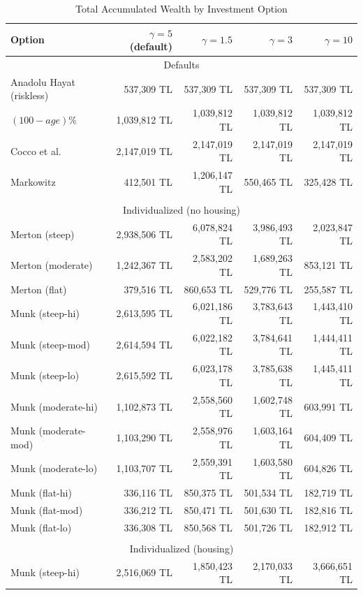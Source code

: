 \begin{table}%
	\centering
	\caption{Total Accumulated Wealth by Investment Option}
	\begin{tabular}[c]{lrrrr}
		\hline
		Option&$\gamma=5$ (default) & $\gamma=1.5$ & $\gamma=3$ & $\gamma=10$\\
		\hline
		\multicolumn{5}{c}{Defaults}\\
		Anadolu Hayat (riskless)&537,309 TL&537,309 TL&537,309 TL&537,309 TL\\
		$(100-age)\%$&1,039,812 TL&1,039,812 TL&1,039,812 TL&1,039,812 TL\\
		Cocco et al.&2,147,019 TL&2,147,019 TL&2,147,019 TL&2,147,019 TL\\
		Markowitz&412,501 TL&1,206,147 TL&550,465 TL&325,428 TL\\
		\multicolumn{5}{c}{}\\
		\multicolumn{5}{c}{Individualized (no housing)}\\
		Merton (steep) & 2,938,506 TL&6,078,824 TL&3,986,493 TL&2,023,847 TL\\
		Merton (moderate) & 1,242,367 TL&2,583,202 TL&1,689,263 TL&853,121 TL\\
		Merton (flat) & 379,516 TL&860,653 TL&529,776 TL&255,587 TL\\
		Munk (steep-hi) & 2,613,595 TL&6,021,186 TL&3,783,643 TL&1,443,410 TL\\
		Munk (steep-mod) & 2,614,594 TL&6,022,182 TL&3,784,641 TL&1,444,411 TL\\	
		Munk (steep-lo) & 2,615,592 TL&6,023,178 TL&3,785,638 TL&1,445,411 TL\\
		Munk (moderate-hi) & 1,102,873 TL&2,558,560 TL&1,602,748 TL&603,991 TL\\
		Munk (moderate-mod) & 1,103,290 TL&2,558,976 TL&1,603,164 TL&604,409 TL\\	
		Munk (moderate-lo) & 1,103,707 TL&2,559,391 TL&1,603,580 TL&604,826 TL\\
		Munk (flat-hi) & 336,116 TL&850,375 TL&501,534 TL&182,719 TL\\
		Munk (flat-mod) & 336,212 TL&850,471 TL&501,630 TL&182,816 TL\\	
		Munk (flat-lo) & 336,308 TL&850,568 TL&501,726 TL&182,912 TL\\
		\multicolumn{5}{c}{}\\
		\multicolumn{5}{c}{Individualized (housing)}\\
		Munk (steep-hi) & 2,516,069 TL&1,850,423 TL&2,170,033 TL&3,666,651 TL\\

\end{tabular}
\end{table}
